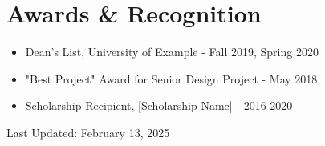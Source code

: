 \documentclass[a4paper,10pt]{article}
\begin{document}
\section*{Awards \& Recognition}
\begin{itemize}
    \item Dean's List, University of Example - Fall 2019, Spring 2020
    \item "Best Project" Award for Senior Design Project - May 2018
    \item Scholarship Recipient, [Scholarship Name] - 2016-2020
\end{itemize}

\vspace{5pt}
\small{Last Updated: February 13, 2025} %
\end{document}
